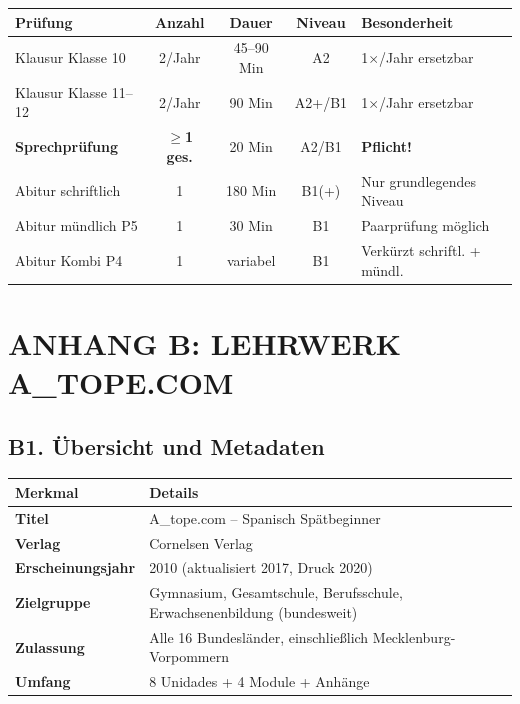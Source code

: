 \documentclass[10pt,a4paper]{article}
\begin{document}
\begin{center}
\small
\begin{tabular}{|p{3.5cm}|c|c|c|p{4cm}|}
\hline
\rowcolor{lightspaet}
\textbf{Prüfung} & \textbf{Anzahl} & \textbf{Dauer} & \textbf{Niveau} & \textbf{Besonderheit} \\
\hline
Klausur Klasse 10 & 2/Jahr & 45--90 Min & A2 & 1$\times$/Jahr ersetzbar \\
\hline
Klausur Klasse 11--12 & 2/Jahr & 90 Min & A2+/B1 & 1$\times$/Jahr ersetzbar \\
\hline
\textbf{Sprechprüfung} & \textbf{$\geq$1 ges.} & 20 Min & A2/B1 & \textbf{Pflicht!} \\
\hline
Abitur schriftlich & 1 & 180 Min & B1(+) & Nur grundlegendes Niveau \\
\hline
Abitur mündlich P5 & 1 & 30 Min & B1 & Paarprüfung möglich \\
\hline
Abitur Kombi P4 & 1 & variabel & B1 & Verkürzt schriftl. + mündl. \\
\hline
\end{tabular}
\end{center}

\newpage


\section*{ANHANG B: LEHRWERK A\_TOPE.COM}

\subsection{B1. Übersicht und Metadaten}

\begin{center}
\small
\begin{tabular}{|p{4cm}|p{9cm}|}
\hline
\rowcolor{lightgray}
\textbf{Merkmal} & \textbf{Details} \\
\hline
\textbf{Titel} & A\_tope.com -- Spanisch Spätbeginner \\
\hline
\textbf{Verlag} & Cornelsen Verlag \\
\hline
\textbf{Erscheinungsjahr} & 2010 (aktualisiert 2017, Druck 2020) \\
\hline
\textbf{Zielgruppe} & Gymnasium, Gesamtschule, Berufsschule, Erwachsenenbildung (bundesweit) \\
\hline
\textbf{Zulassung} & Alle 16 Bundesländer, einschließlich Mecklenburg-Vorpommern \\
\hline
\textbf{Umfang} & 8 Unidades + 4 Module + Anhänge \\
\hline
\end{tabular}
\end{center}
\end{document}
